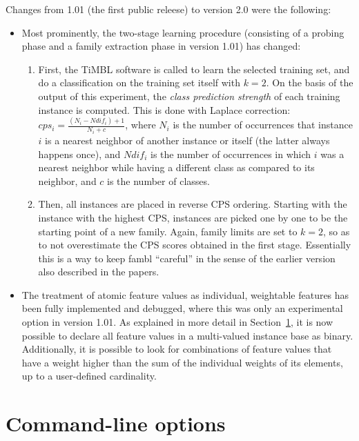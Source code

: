 \documentclass[11pt]{article}
\begin{document}
Changes from 1.01 (the first public releese) to version 2.0 were the
following:

\begin{itemize}
\item
Most prominently, the two-stage learning procedure (consisting of a
probing phase and a family extraction phase in version 1.01) has changed:
        \begin{enumerate}
        \item
        First, the TiMBL software is called to learn the selected
        training set, and do a classification on the training
        set itself with $k=2$. On the basis of the output of this
        experiment, the {\em class prediction strength}\/ of each
        training instance is computed. This is
        done with Laplace correction: $cps_{i} = 
        \frac{(N_{i}-Ndif_{i})+1}{N_{i}+c}$, where $N_{i}$ is the
        number of occurrences that instance $i$ is a nearest neighbor
        of another instance or itself (the latter always happens once),
        and $Ndif_{i}$ is the number of occurrences in which $i$ was
        a nearest neighbor while having a different class as compared
        to its neighbor, and $c$ is the number of classes.
        \item
        Then, all instances are placed in reverse CPS ordering. Starting
        with the instance with the highest CPS, instances are picked
        one by one to be the starting point of a new family. Again,
        family limits are set to $k=2$, so as to not overestimate the
        CPS scores obtained in the first stage. Essentially this is a way
        to keep {\sc fambl} ``careful'' in the sense of the earlier
        version also described in the papers.
        \end{enumerate}
\item
The treatment of atomic feature values as individual, weightable
features has been fully implemented and debugged, where this was only
an experimental option in version 1.01. As explained in more detail in
Section~\ref{command}, it is now possible to declare all feature
values in a multi-valued instance base as binary. Additionally, it is
possible to look for combinations of feature values that have a weight
higher than the sum of the individual weights of its elements, up to a
user-defined cardinality.
\end{itemize}


\section{Command-line options}
\label{command}
\end{document}
